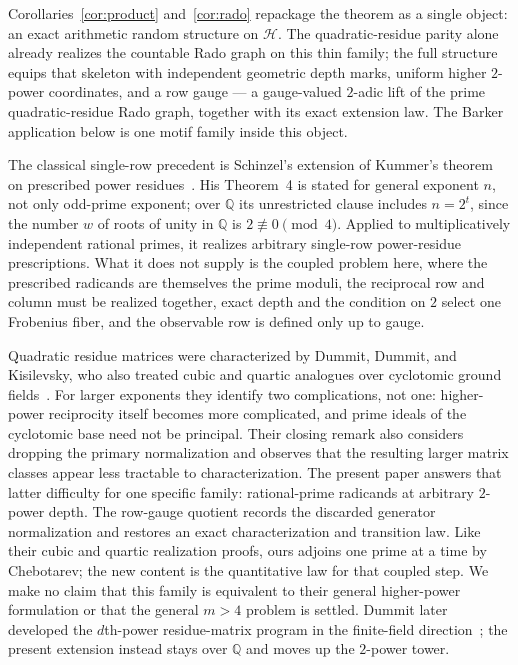 \documentclass[11pt]{article}
\theoremstyle{definition}
\theoremstyle{remark}
\newcommand{\Q}{\mathbb Q}
\begin{document}
Corollaries~\ref{cor:product} and~\ref{cor:rado} repackage the theorem as
a single object: an exact arithmetic random structure on $\mathcal H$.
The quadratic-residue parity alone already realizes the countable Rado
graph on this thin family; the full structure equips that skeleton with
independent geometric depth marks, uniform higher $2$-power coordinates,
and a row gauge --- a gauge-valued $2$-adic lift of the prime
quadratic-residue Rado graph, together with its exact extension law.
The Barker application below is one motif family inside this object.

The classical single-row precedent is Schinzel's extension of Kummer's
theorem on prescribed power residues~\cite{Schinzel75,Schinzel77,Schinzel80}.
His Theorem~4 is stated for general exponent $n$, not only odd-prime
exponent; over $\Q$ its unrestricted clause includes $n=2^t$, since the
number $w$ of roots of unity in $\Q$ is $2\not\equiv0\pmod4$.  Applied to
multiplicatively independent rational primes, it realizes arbitrary
single-row power-residue prescriptions.  What it does not supply is the
coupled problem here, where the prescribed radicands are themselves the
prime moduli, the reciprocal row and column must be realized together,
exact depth and the condition on $2$ select one Frobenius fiber, and the
observable row is defined only up to gauge.

Quadratic residue matrices were characterized by Dummit, Dummit, and
Kisilevsky, who also treated cubic and quartic analogues over cyclotomic
ground fields~\cite{DDK}.  For larger exponents they identify two
complications, not one: higher-power reciprocity itself becomes more
complicated, and prime ideals of the cyclotomic base need not be principal.
Their closing remark also considers dropping the primary normalization and
observes that the resulting larger matrix classes appear less tractable to
characterization.  The present paper answers that latter difficulty for one
specific family: rational-prime radicands at arbitrary $2$-power depth.  The
row-gauge quotient records the discarded generator normalization and restores
an exact characterization and transition law.  Like their cubic and quartic
realization proofs, ours adjoins one prime at a time by Chebotarev; the new
content is the quantitative law for that coupled step.  We make no claim that
this family is equivalent to their general higher-power formulation or that
the general $m>4$ problem is settled.  Dummit later developed the
$d$th-power residue-matrix program in the finite-field direction~\cite{DummitFF};
the present extension instead stays over $\Q$ and moves up the $2$-power tower.
\end{document}

